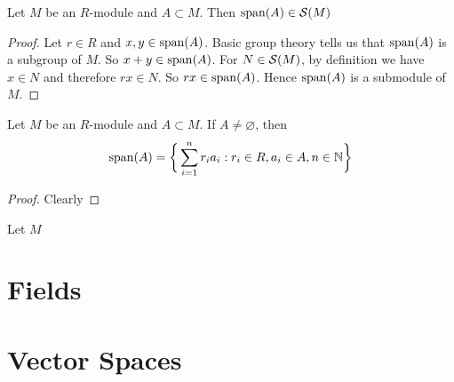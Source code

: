 \documentclass{book}
\begin{document}
	\begin{ex}
	Let $M$ be an $R$-module and $A \subset M$. Then 
	$\operatorname{span}(A) \in \mathcal{S}(M)$
	\end{ex}
	
	\begin{proof}
	Let $r \in R$ and $x,y \in \operatorname{span}(A)$. Basic group theory tells us that $\operatorname{span}(A)$ is a subgroup of $M$. So $x+y \in \operatorname{span}(A)$. For $N \in \mathcal{S}(M)$, by definition we have $x \in N$ and therefore $rx \in N$. So $rx \in \operatorname{span}(A)$. Hence $\operatorname{span}(A)$ is a submodule of $M$.
	\end{proof}
	
	\begin{ex}
	Let $M$ be an $R$-module and $A \subset M$. If $A \neq \varnothing$, then $$\operatorname{span}(A) = \bigg \{\sum\limits_{i=1}^n r_ia_i: r_i \in R, a_i \in A, n \in \mathbb{N} \bigg \}$$
	\end{ex}
	
	\begin{proof}
	Clearly 
	\end{proof}
	
	\begin{defn}
	Let $M$
	\end{defn}
	
	
	
	
	
	
	
	
	
	
	
	
	
	
	
	
	
	
	
	
	\newpage
	\section{Fields}
	
	
	
	
	
	
	
	
	
	
	
	
	
	
	
	
	
	
	
	
	
	
	
	
	
	
	
	
	\newpage
	\section{Vector Spaces}
	
\end{document}
